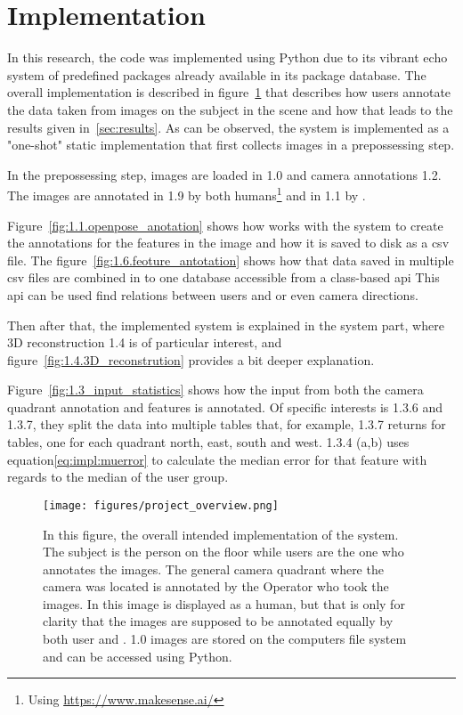 \section{Implementation}
\label{sec:work}

In this research, the code was implemented using Python due to its vibrant echo system of predefined packages already available in its package database.
The overall implementation is described in figure~\ref{fig:project_overview} that describes how users annotate the data taken from images on the subject in the scene and how that leads to the results given in~\ref{sec:results}.
As can be observed, the system is implemented as a "one-shot" static implementation that first collects images in a prepossessing step.

In the prepossessing step, images are loaded in 1.0 and camera annotations 1.2.
The images are annotated in 1.9 by both humans\footnote{Using \url{https://www.makesense.ai/}} and in 1.1 by \openpose{ }.

Figure~\ref{fig:1.1.openpose_anotation} shows how \openpose{ } works with the system to create the annotations for the features in the image and how it is saved to disk as a \ac{csv} file.
The figure~\ref{fig:1.6.feoture_antotation} shows how that data saved in multiple \ac{csv} files are combined in to one database accessible from a class-based \ac{api}
This \ac{api} can be used find relations between users and \openpose{ } or even camera directions.

Then after that, the implemented system is explained in the system part, where 3D reconstruction 1.4 is of particular interest, and figure~\ref{fig:1.4.3D_reconstrution} provides a bit deeper explanation.

Figure~\ref {fig:1.3_input_statistics} shows how the input from both the camera quadrant annotation and features is annotated.
Of specific interests is 1.3.6 and 1.3.7, they split the data into multiple tables that, for example, 1.3.7 returns for tables, one for each quadrant north, east, south and west.
1.3.4 (a,b) uses equation\ref{eq:impl:muerror} to calculate the median error for that feature with regards to the median of the user group.




\begin{figure}[ht]
\begin{center}
    \texttt{[image: figures/project\_overview.png]}
\end{center}
\caption[Project Overview]{In this figure, the overall intended implementation of the system. The subject is the person on the floor while users are the one who annotates the images. The general camera quadrant where the camera was located is annotated by the Operator who took the images. In this image \openpose is displayed as a human, but that is only for clarity that the images are supposed to be annotated equally by both user and \openpose. 1.0 images are stored on the computers file system and can be accessed using Python.}
\label{fig:project_overview}
\end{figure}



